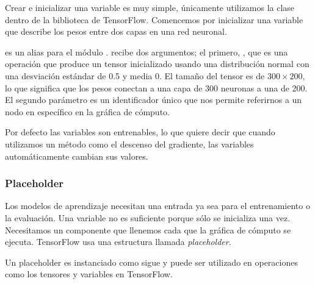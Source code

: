 Crear e inicializar una variable es muy simple,
únicamente utilizamos la clase 
dentro de la biblioteca de TensorFlow.
Comencemos por inicializar una variable
que describe los pesos entre dos capas en una red neuronal.

\begin{sphinxVerbatim}[commandchars=\\\{\}]
  \PYG{p}{[} \PYG{p}{]} 
\end{sphinxVerbatim}

 es un alias para el módulo .
 recibe dos argumentos; el primero,
, que es una operación que
produce un tensor inicializado usando una
distribución normal con una desviación estándar de
0.5 y media 0. El tamaño del tensor es de $300 \times
200$, lo que significa que los pesos conectan a una
capa de 300 neuronas a una de 200. El segundo
parámetro es un identificador único que nos
permite referirnos a un nodo en específico en
la gráfica de cómputo.

Por defecto las variables son entrenables,
lo que quiere decir que cuando utilizamos un método
como el descenso del gradiente, las variables
automáticamente cambian sus valores.


\subsubsection{Placeholder}

Los modelos de aprendizaje necesitan una entrada ya sea 
para el entrenamiento o la evaluación. Una variable no es 
suficiente porque sólo se inicializa una vez. Necesitamos un
componente que llenemos cada que la gráfica de cómputo se ejecuta.
TensorFlow usa una estructura llamada \textit{placeholder}. 

Un placeholder es instanciado como sigue y puede ser utilizado en operaciones como los tensores
y variables en TensorFlow.

